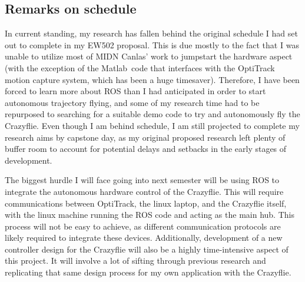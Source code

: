 \documentclass[onecolumn,10pt]{IEEEtran}
\newcommand{\MATLAB}{Matlab}
\begin{document}
\subsection{Remarks on schedule}
In current standing, my research has fallen behind the original schedule I had set out to complete in my EW502 proposal. This is due mostly to the fact that I was unable to utilize most of MIDN Canlas' work to jumpstart the hardware aspect (with the exception of the \MATLAB\ code that interfaces with the OptiTrack motion capture system, which has been a huge timesaver). Therefore, I have been forced to learn more about ROS than I had anticipated in order to start autonomous trajectory flying, and some of my research time had to be repurposed to searching for a suitable demo code to try and autonomously fly the Crazyflie. Even though I am behind schedule, I am still projected to complete my research aims by capstone day, as my original proposed research left plenty of buffer room to account for potential delays and setbacks in the early stages of development. 

The biggest hurdle I will face going into next semester will be using ROS to integrate the autonomous hardware control of the Crazyflie. This will require communications between OptiTrack, the linux laptop, and the Crazyflie itself, with the linux machine running the ROS code and acting as the main hub. This process will not be easy to achieve, as different communication protocols are likely required to integrate these devices. Additionally, development of a new controller design for the Crazyflie will also be a highly time-intensive aspect of this project. It will involve a lot of sifting through previous research and replicating that same design process for my own application with the Crazyflie.



\end{document}
